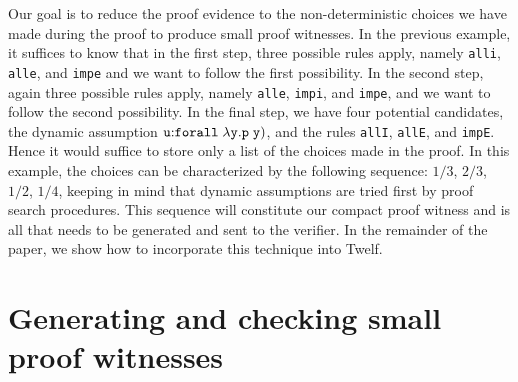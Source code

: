 \documentclass{llncs}
\newcommand{\forallLF}{\tt{forall}\;}
\begin{document}
 Our goal is to reduce the proof evidence to the non-deterministic
 choices we have made during the proof to produce small proof 
witnesses. In the previous example, it suffices to know that in
the first step, three possible rules apply, namely {\tt alli}, {\tt
alle}, and {\tt impe} and we want to follow the first possibility. In
the second step, again three possible rules apply, namely {\tt alle},
{\tt impi}, and {\tt impe}, and we want to follow the second
possibility. In the final step, we have four potential candidates, the
dynamic assumption ${\tt u}{:} \forallLF \lambda y. p\; y)$, and the rules
{\tt allI}, {\tt allE}, and {\tt impE}.  Hence it would suffice to
store only a list of the choices made in the proof. In this example,
the choices can be characterized by the following sequence: $1/3$,
$2/3$, $1/2$, $1/4$, keeping in mind that dynamic assumptions are
tried first by proof search procedures. This sequence will constitute
our compact proof witness and is all that needs to be generated and
sent to the verifier. In the remainder of the paper, we show how
to incorporate this technique into Twelf.

\section{Generating and checking small proof witnesses}
\label{sec:oracles}

\end{document}
